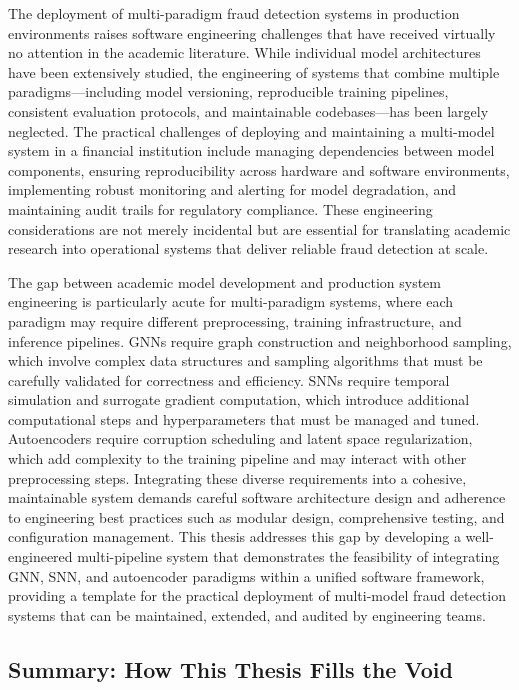 The deployment of multi-paradigm fraud detection systems in production
environments raises software engineering challenges that have received virtually
no attention in the academic literature. While individual model architectures
have been extensively studied, the engineering of systems that combine multiple
paradigms---including model versioning, reproducible training pipelines,
consistent evaluation protocols, and maintainable codebases---has been largely
neglected. The practical challenges of deploying and maintaining a multi-model
system in a financial institution include managing dependencies between model
components, ensuring reproducibility across hardware and software environments,
implementing robust monitoring and alerting for model degradation, and
maintaining audit trails for regulatory compliance. These engineering
considerations are not merely incidental but are essential for translating
academic research into operational systems that deliver reliable fraud detection
at scale.

The gap between academic model development and production system engineering is
particularly acute for multi-paradigm systems, where each paradigm may require
different preprocessing, training infrastructure, and inference pipelines. GNNs
require graph construction and neighborhood sampling, which involve complex data
structures and sampling algorithms that must be carefully validated for
correctness and efficiency. SNNs require temporal simulation and surrogate
gradient computation, which introduce additional computational steps and
hyperparameters that must be managed and tuned. Autoencoders require corruption
scheduling and latent space regularization, which add complexity to the training
pipeline and may interact with other preprocessing steps. Integrating these
diverse requirements into a cohesive, maintainable system demands careful
software architecture design and adherence to engineering best practices such as
modular design, comprehensive testing, and configuration management. This thesis
addresses this gap by developing a well-engineered multi-pipeline system that
demonstrates the feasibility of integrating GNN, SNN, and autoencoder paradigms
within a unified software framework, providing a template for the practical
deployment of multi-model fraud detection systems that can be maintained,
extended, and audited by engineering teams.

\subsection{Summary: How This Thesis Fills the Void}

